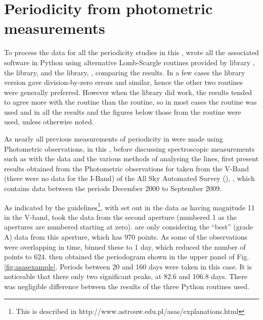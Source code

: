 \chapter{Periodicity from photometric measurements} %
\protect\label{chapter:photometry}

To process the data for all the periodicity studies in this \paperorthesis, {\Firstp} wrote all the associated software
in Python using alternative Lomb-Scargle routines provided by {\scipy} library \citep{jones01}, the {\astroml} library,
\citep{vanderplas12} and the {\gatspy} library, \citep{vanderplas15}, comparing the results. In a few cases the {\scipy}
library version gave division-by-zero errors and similar, hence the other two routines were generally preferred. However
when the {\scipy} library did work, the results tended to agree more with the {\gatspy} routine than the {\astroml}
routine, so in most cases the {\gatspy} routine was used and in all the results and the figures below those from
the {\gatspy} routine were used, unless otherwise noted.

As nearly all previous measurements of periodicity in {\prox} were made using Photometric observations, in this
{\paperorthesis}, before discussing spectroscopic measurements such as with the {\harps} data and the various methods of
analysing the {\ha} lines, {\Firstp} first present results obtained from the Photometric observations for {\prox} taken
from the V-Band (there were no data for the I-Band) of the All Sky Automated Survey (\asas), \citep{pojmanski97}, which
contains data between the periods December 2000 to September 2009.

As indicated by the {\asas} guidelines\footnote{This is described in http://www.astrouw.edu.pl/asas/explanations.html},
with {\prox} set out in the {\asas} data as having magnitude 11 in the V-band, {\Firstp} took the data from the second
aperture (numbered 1 as the apertures are numbered starting at zero). {\FirstP} are only considering the ``best'' (grade
A) data from this aperture, which has 970 points. As some of the observations were overlapping in time, {\Firstp} binned these
to 1 day, which reduced the number of points to 624. {\FirstP} then obtained the periodogram shown in the upper panel of
Fig. \ref{fig:asasexample}. Periods between 20 and 160 days were taken in this case. It is noticeable that there only
two significant peaks, at 82.6 and 106.8 days. There was negligible difference between the results of the three Python
routines used. %

